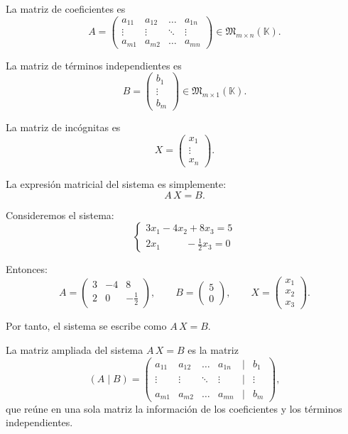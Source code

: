 \documentclass[a4paper,12pt]{article}
\begin{document}
\begin{procedimiento}[title=Matrices del sistema]
La matriz de coeficientes es
\[
A =
\begin{pmatrix}
a_{11} & a_{12} & \dots & a_{1n}\\
\vdots & \vdots & \ddots & \vdots\\
a_{m1} & a_{m2} & \dots & a_{mn}
\end{pmatrix}
\in \mathfrak{M}_{m \times n}(\mathbb{K}).
\]

La matriz de términos independientes es
\[
B =
\begin{pmatrix}
b_1 \\ \vdots \\ b_m
\end{pmatrix}
\in \mathfrak{M}_{m \times 1}(\mathbb{K}).
\]

La matriz de incógnitas es
\[
X =
\begin{pmatrix}
x_1 \\ \vdots \\ x_n
\end{pmatrix}.
\]

La expresión matricial del sistema es simplemente:
\[
A\,X = B.
\]
\end{procedimiento}

\begin{ejemplo}[title=Ejemplo de sistema y su expresión matricial]
Consideremos el sistema:
\[
\begin{cases}
3x_1 - 4x_2 + 8x_3 = 5 \\
2x_1 \;\;\;\;\;\;\;\;\; - \tfrac{1}{2}x_3 = 0
\end{cases}
\]

Entonces:
\[
A =
\begin{pmatrix}
3 & -4 & 8 \\
2 & 0 & -\tfrac12
\end{pmatrix},
\qquad
B =
\begin{pmatrix}
5 \\ 0
\end{pmatrix},
\qquad
X =
\begin{pmatrix}
x_1 \\ x_2 \\ x_3
\end{pmatrix}.
\]

Por tanto, el sistema se escribe como $A\,X = B$.
\end{ejemplo}

\begin{procedimiento}[title=Matriz ampliada del sistema]
La matriz ampliada del sistema $A\,X=B$ es la matriz
\[
(A \mid B)
=
\begin{pmatrix}
a_{11} & a_{12} & \dots & a_{1n} & \Big| & b_1 \\
\vdots & \vdots & \ddots & \vdots & \Big| & \vdots \\
a_{m1} & a_{m2} & \dots & a_{mn} & \Big| & b_m
\end{pmatrix},
\]
que reúne en una sola matriz la información de los coeficientes y los términos independientes.
\end{procedimiento}
\end{document}
